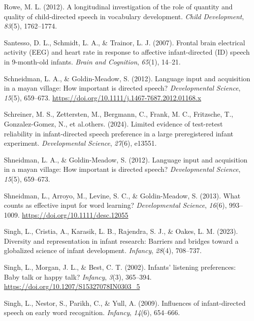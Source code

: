 \documentclass[
  english,
  ,man,floatsintext]{apa6}
\newlength{\cslhangindent}
\newenvironment{CSLReferences}[2] %
 {\begin{list}{}{%
  \setlength{\itemindent}{0pt}
  \setlength{\leftmargin}{0pt}
  \setlength{\parsep}{0pt}
  \ifodd #1
   \setlength{\leftmargin}{\cslhangindent}
   \setlength{\itemindent}{-1\cslhangindent}
  \fi
  \setlength{\itemsep}{#2\baselineskip}}}
 {\end{list}}
\begin{document}
\begin{CSLReferences}{1}{0}
Rowe, M. L. (2012). A longitudinal investigation of the role of quantity and quality of child-directed speech in vocabulary development. \emph{Child Development}, \emph{83}(5), 1762--1774.

Santesso, D. L., Schmidt, L. A., \& Trainor, L. J. (2007). Frontal brain electrical activity (EEG) and heart rate in response to affective infant-directed (ID) speech in 9-month-old infants. \emph{Brain and Cognition}, \emph{65}(1), 14--21.

Schneidman, L. A., \& Goldin-Meadow, S. (2012). Language input and acquisition in a mayan village: How important is directed speech? \emph{Developmental Science}, \emph{15}(5), 659--673. \url{https://doi.org/10.1111/j.1467-7687.2012.01168.x}

Schreiner, M. S., Zettersten, M., Bergmann, C., Frank, M. C., Fritzsche, T., Gonzalez-Gomez, N., et al.others. (2024). Limited evidence of test-retest reliability in infant-directed speech preference in a large preregistered infant experiment. \emph{Developmental Science}, \emph{27}(6), e13551.

Shneidman, L. A., \& Goldin-Meadow, S. (2012). Language input and acquisition in a mayan village: How important is directed speech? \emph{Developmental Science}, \emph{15}(5), 659--673.

Shneidman, L., Arroyo, M., Levine, S. C., \& Goldin-Meadow, S. (2013). What counts as effective input for word learning? \emph{Developmental Science}, \emph{16}(6), 993--1009. \url{https://doi.org/10.1111/desc.12055}

Singh, L., Cristia, A., Karasik, L. B., Rajendra, S. J., \& Oakes, L. M. (2023). Diversity and representation in infant research: Barriers and bridges toward a globalized science of infant development. \emph{Infancy}, \emph{28}(4), 708--737.

Singh, L., Morgan, J. L., \& Best, C. T. (2002). Infants' listening preferences: Baby talk or happy talk? \emph{Infancy}, \emph{3}(3), 365--394. \url{https://doi.org/10.1207/S15327078IN0303_5}

Singh, L., Nestor, S., Parikh, C., \& Yull, A. (2009). Influences of infant-directed speech on early word recognition. \emph{Infancy}, \emph{14}(6), 654--666.


\end{CSLReferences}
\end{document}
